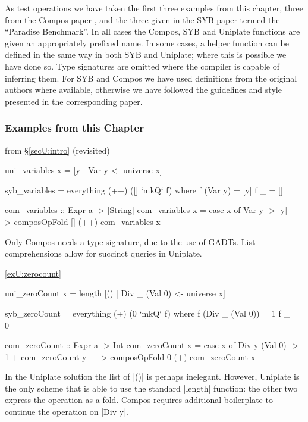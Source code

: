 As test operations we have taken the first three examples from this chapter, three from the Compos paper \citep{bringert:compos}, and the three given in the SYB paper \citep{lammel:syb} termed the ``Paradise Benchmark''. In all cases the Compos, SYB and Uniplate functions are given an appropriately prefixed name. In some cases, a helper function can be defined in the same way in both SYB and Uniplate; where this is possible we have done so. Type signatures are omitted where the compiler is capable of inferring them. For SYB and Compos we have used definitions from the original authors where available, otherwise we have followed the guidelines and style presented in the corresponding paper.

\subsubsection{Examples from this Chapter}

\begin{exampleany}{from \S\ref{secU:intro} (revisited)}

\ignore\begin{code}
uni_variables x = [y | Var y <- universe x]

syb_variables = everything (++) ([] `mkQ` f)
    where  f (Var y)  = [y]
           f _        = []

com_variables :: Expr a -> [String]
com_variables x = case x of
    Var y -> [y]
    _ -> composOpFold [] (++) com_variables x
\end{code}

Only Compos needs a type signature, due to the use of GADTs. List comprehensions allow for succinct queries in Uniplate.
\end{exampleany}

\begin{examplerevisit}{\ref{exU:zerocount}}

\ignore\begin{code}
uni_zeroCount x = length [() | Div _ (Val 0) <- universe x]
\end{code}
\begin{onepage}
\ignore\begin{code}
syb_zeroCount = everything (+) (0 `mkQ` f)
    where  f (Div _ (Val 0))  = 1
           f _                = 0

com_zeroCount :: Expr a -> Int
com_zeroCount x = case x of
    Div y (Val 0) -> 1 + com_zeroCount y
    _ -> composOpFold 0 (+) com_zeroCount x
\end{code}
\end{onepage}

In the Uniplate solution the list of |()| is perhaps inelegant. However, Uniplate is the only scheme that is able to use the standard |length| function: the other two express the operation as a fold. Compos requires additional boilerplate to continue the operation on |Div y|.
\end{examplerevisit}

